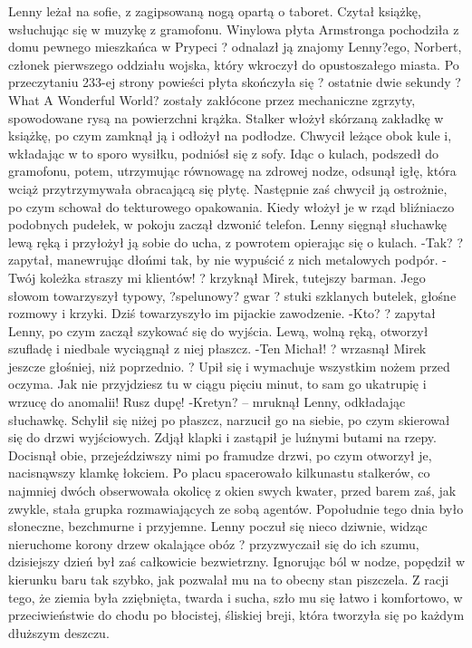 \documentclass[../MAIN.tex]{subfiles}
\begin{document}
Lenny leżał na sofie, z zagipsowaną nogą opartą o taboret. Czytał książkę, wsłuchując się w muzykę z gramofonu. Winylowa płyta Armstronga pochodziła z domu pewnego mieszkańca w Prypeci ? odnalazł ją znajomy Lenny?ego, Norbert, członek pierwszego oddziału wojska, który wkroczył do opustoszałego miasta.
Po przeczytaniu 233-ej strony powieści płyta skończyła się ? ostatnie dwie sekundy ?What A Wonderful World? zostały zakłócone przez mechaniczne zgrzyty, spowodowane rysą na powierzchni krążka.
Stalker włożył skórzaną zakładkę w książkę, po czym zamknął ją i odłożył na podłodze. Chwycił leżące obok kule i, wkładając w to sporo wysiłku, podniósł się z sofy. Idąc o kulach, podszedł do gramofonu, potem, utrzymując równowagę na zdrowej nodze, odsunął igłę, która wciąż przytrzymywała obracającą się płytę. Następnie zaś chwycił ją ostrożnie, po czym schował do tekturowego opakowania. Kiedy włożył je w rząd bliźniaczo podobnych pudełek, w pokoju zaczął dzwonić telefon. Lenny sięgnął słuchawkę lewą ręką i przyłożył ją sobie do ucha, z powrotem opierając się o kulach.
-Tak? ? zapytał, manewrując dłońmi tak, by nie wypuścić z nich metalowych podpór.
-Twój koleżka straszy mi klientów! ? krzyknął Mirek, tutejszy barman. Jego słowom towarzyszył typowy, ?spelunowy? gwar ? stuki szklanych butelek, głośne rozmowy i krzyki. Dziś towarzyszyło im pijackie zawodzenie.
-Kto? ? zapytał Lenny, po czym zaczął szykować się do wyjścia. Lewą, wolną ręką, otworzył szufladę i niedbale wyciągnął z niej płaszcz.
-Ten Michał! ? wrzasnął Mirek jeszcze głośniej, niż poprzednio. ? Upił się i wymachuje wszystkim nożem przed oczyma. Jak nie przyjdziesz tu w ciągu pięciu minut, to sam go ukatrupię i wrzucę do anomalii! Rusz dupę!
-Kretyn? -- mruknął Lenny, odkładając słuchawkę. Schylił się niżej po płaszcz, narzucił go na siebie, po czym skierował się do drzwi wyjściowych. Zdjął klapki i zastąpił je luźnymi butami na rzepy. Docisnął obie, przejeździwszy nimi po framudze drzwi, po czym otworzył je, nacisnąwszy klamkę łokciem.
Po placu spacerowało kilkunastu stalkerów, co najmniej dwóch obserwowała okolicę z okien swych kwater, przed barem zaś, jak zwykle, stała grupka rozmawiających ze sobą agentów. Popołudnie tego dnia było słoneczne, bezchmurne i przyjemne. Lenny poczuł się nieco dziwnie, widząc nieruchome korony drzew okalające obóz ? przyzwyczaił się do ich szumu, dzisiejszy dzień był zaś całkowicie bezwietrzny.
Ignorując ból w nodze, popędził w kierunku baru tak szybko, jak pozwalał mu na to obecny stan piszczela. Z racji tego, że ziemia była zziębnięta, twarda i sucha, szło mu się łatwo i komfortowo, w przeciwieństwie do chodu po błocistej, śliskiej breji, która tworzyła się po każdym dłuższym deszczu.
\end{document}
